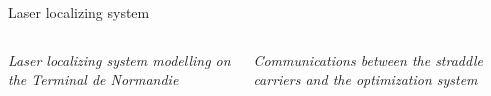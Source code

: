 \documentclass{beamer}
\begin{document}
\begin{frame}{Laser localizing system}
\begin{columns}
    \begin{column}[l]{7cm}
	  \begin{center}
	   \tiny \textit{Laser localizing system modelling on the Terminal de Normandie}
	  \end{center}
    \end{column}
    \begin{column}[r]{4.5cm}	
      \begin{flushright}
	\begin{center}
	   \tiny \textit{Communications between the straddle carriers and the optimization system}
	  \end{center}
      \end{flushright}
    \end{column}
 \end{columns}	

\end{frame}
\end{document}
